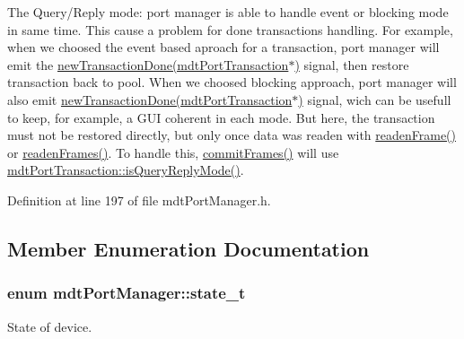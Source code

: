 The Query/\-Reply mode\-: port manager is able to handle event or blocking mode in same time. This cause a problem for done transactions handling. For example, when we choosed the event based aproach for a transaction, port manager will emit the \hyperlink{classmdt_port_manager_a416a24db1048e9f66aef27ea810954d2}{new\-Transaction\-Done(mdt\-Port\-Transaction$\ast$)} signal, then restore transaction back to pool. When we choosed blocking approach, port manager will also emit \hyperlink{classmdt_port_manager_a416a24db1048e9f66aef27ea810954d2}{new\-Transaction\-Done(mdt\-Port\-Transaction$\ast$)} signal, wich can be usefull to keep, for example, a G\-U\-I coherent in each mode. But here, the transaction must not be restored directly, but only once data was readen with \hyperlink{classmdt_port_manager_a830ae182d06dd6a52c43a7f45b9240ac}{readen\-Frame()} or \hyperlink{classmdt_port_manager_addd5dcae9644cea42a9871205af41796}{readen\-Frames()}. To handle this, \hyperlink{classmdt_port_manager_a84d37b380080eb26e56c68424dedd958}{commit\-Frames()} will use \hyperlink{classmdt_port_transaction_a9da1cc7a191cd21a2e532d277aa3c628}{mdt\-Port\-Transaction\-::is\-Query\-Reply\-Mode()}. 

Definition at line 197 of file mdt\-Port\-Manager.\-h.



\subsection{Member Enumeration Documentation}
\hypertarget{classmdt_port_manager_a9448339d7f08ca5e18b904df25b382da}{
\subsubsection[{state\-\_\-t}]{\setlength{\rightskip}{0pt plus 5cm}enum {\bf mdt\-Port\-Manager\-::state\-\_\-t}}}\label{classmdt_port_manager_a9448339d7f08ca5e18b904df25b382da}


State of device. 

